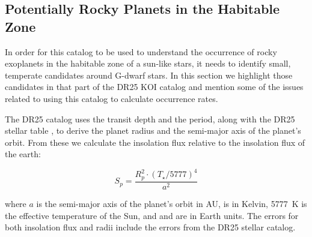 \label{s:hz}
\subsection{Potentially Rocky Planets in the Habitable Zone}
In order for this catalog to be used to understand the occurrence of rocky exoplanets in the habitable zone of a sun-like stars, it needs to identify small, temperate candidates around G-dwarf stars.  In this section we highlight those candidates in that part of the DR25 KOI catalog and mention some of the issues related to using this catalog to calculate occurrence rates.

The DR25 catalog uses the transit depth and the period, along with the DR25 stellar table \citet{Mathur2017ApJS}, to derive the planet radius and the semi-major axis of the planet's orbit.  From these we calculate the insolation flux relative to the insolation flux of the earth:

\begin{equation}
S_{p} = \frac{R_{p}^{2} \cdot (T_{\star}/5777)^{4}}{a^{2}}
\end{equation}

\noindent where $a$ is the semi-major axis of the planet's orbit in AU, \tstar{} is in Kelvin, 5777~K is the effective temperature of the Sun, and \sp{} and \rp{} are in Earth units. The errors for both insolation flux and radii include the errors from the DR25 stellar catalog. 


